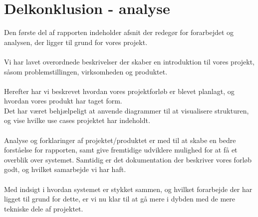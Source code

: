 \section{Delkonklusion - analyse}
Den første del af rapporten indeholder afsnit der redegør for forarbejdet og analysen, der ligger til grund for vores projekt.
\\\\
Vi har lavet overordnede beskrivelser der skaber en introduktion til vores projekt, såsom problemstillingen, virksomheden og produktet.
\\\\
Herefter har vi beskrevet hvordan vores projektforløb er blevet planlagt, og hvordan vores produkt har taget form.\\
Det har været behjælpeligt at anvende diagrammer til at visualisere strukturen, og vise hvilke use cases projektet har indeholdt.
\\\\
Analyse og forklaringer af projektet/produktet er med til at skabe en bedre forståelse for rapporten, samt give fremtidige udviklere
mulighed for at få et overblik over systemet. Samtidig er det dokumentation der beskriver vores forløb godt, og hvilket samarbejde vi har haft.
\\\\
Med indsigt i hvordan systemet er stykket sammen, og hvilket forarbejde der har ligget til grund for dette, er vi nu klar til at gå mere i dybden
med de mere tekniske dele af projektet.
